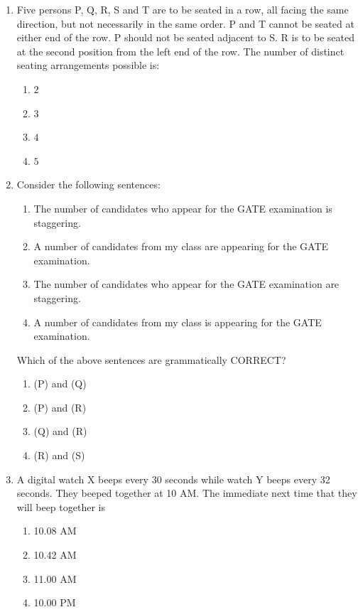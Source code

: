 \documentclass[journal]{IEEEtran}
\theoremstyle{remark}
\begin{document}
\begin{enumerate}
\item Five persons P, Q, R, S and T are to be seated in a row, all facing the same direction, but not necessarily in the same order. P and T cannot be seated at either end of the row. P should not be seated adjacent to S. R is to be seated at the second position from the left end of the row. The number of distinct seating arrangements possible is: \hfill{}
\begin{multicols}{4}
\begin{enumerate}
\item $2$
\item $3$
\item $4$
\item $5$
\end{enumerate}
\end{multicols}

\item Consider the following sentences: \hfill{} 
\begin{enumerate}[label=\Alph*), start=16]
  \item  The number of candidates who appear for the GATE examination is staggering.
  \item  A number of candidates from my class are appearing for the GATE examination.
  \item  The number of candidates who appear for the GATE examination are staggering.
  \item  A number of candidates from my class is appearing for the GATE examination.
\end{enumerate}
Which of the above sentences are grammatically CORRECT?
\begin{multicols}{4}
\begin{enumerate}
\item (P) and (Q)
\item (P) and (R)
\item (Q) and (R)
\item (R) and (S)
\end{enumerate}
\end{multicols}

\item A digital watch X beeps every 30 seconds while watch Y beeps every 32 seconds. They beeped together at 10 AM. The immediate next time that they will beep together is \hfill{}
\begin{multicols}{4}
\begin{enumerate}
\item 10.08 AM
\item 10.42 AM
\item 11.00 AM
\item 10.00 PM
\end{enumerate}
\end{multicols}


\end{enumerate}
\end{document}
